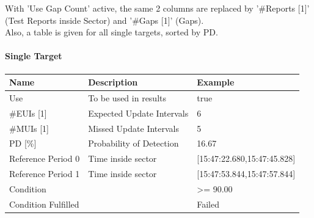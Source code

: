 With 'Use Gap Count' active, the same 2 columns are replaced by '\#Reports [1]' (Test Reports inside Sector) and '\#Gaps [1]' (Gaps). \\

Also, a table is given for all single targets, sorted by PD.

\paragraph{Single Target}

\begin{center}
 \begin{table}[H]
  \begin{tabularx}{\textwidth}{ | l | X |  l | }
    \hline
    \textbf{Name} & \textbf{Description} & \textbf{Example} \\ \hline
    Use & To be used in results & true \\ \hline
    \#EUIs [1] & Expected Update Intervals & 6 \\ \hline
    \#MUIs [1] & Missed Update Intervals & 5 \\ \hline
    PD [\%] & Probability of Detection & 16.67 \\ \hline
    Reference Period 0 & Time inside sector & [15:47:22.680,15:47:45.828] \\ \hline
    Reference Period 1 & Time inside sector & [15:47:53.844,15:47:57.844] \\ \hline
    Condition &  & >= 90.00 \\ \hline
    Condition Fulfilled &  & Failed \\ \hline
\end{tabularx}
\end{table}
\end{center}
